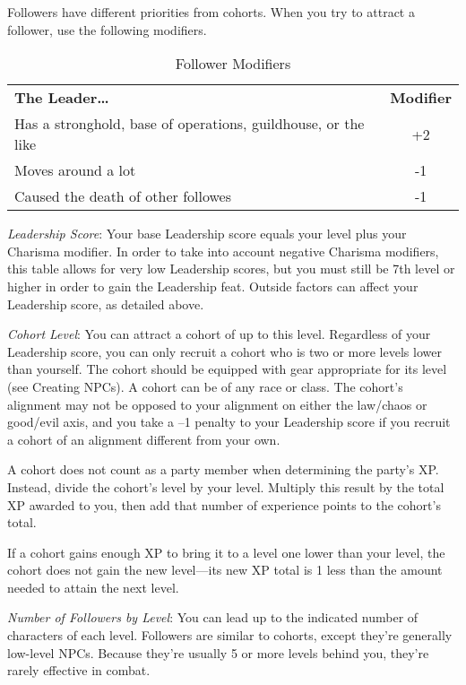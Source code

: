 				
Followers have different priorities from cohorts. When you try to attract a follower, use the following modifiers.\newline

\begin{table}[htb]
\sffamily
{}
\caption{Follower Modifiers}
\centering
\begin{tabularx}{\linewidth}{Xc}
\textbf{The Leader\ldots{}} & \textbf{Modifier}\\
Has a stronghold, base of operations, guildhouse, or the like & +2\\
Moves around a lot & -1\\
Caused the death of other followes & -1\\
\end{tabularx}
\end{table}
				
\textit{Leadership Score}: Your base Leadership score equals your level plus your Charisma modifier. In order to take into account negative Charisma modifiers, this table allows for very low Leadership scores, but you must still be 7th level or higher in order to gain the Leadership feat. Outside factors can affect your Leadership score, as detailed above.
				
\textit{Cohort Level}: You can attract a cohort of up to this level. Regardless of your Leadership score, you can only recruit a cohort who is two or more levels lower than yourself. The cohort should be equipped with gear appropriate for its level (see Creating NPCs). A cohort can be of any race or class. The cohort's alignment may not be opposed to your alignment on either the law/chaos or good/evil axis, and you take a --1 penalty to your Leadership score if you recruit a cohort of an alignment different from your own.\newline
				
A cohort does not count as a party member when determining the party's XP. Instead, divide the cohort's level by your level. Multiply this result by the total XP awarded to you, then add that number of experience points to the cohort's total.

If a cohort gains enough XP to bring it to a level one lower than your level, the cohort does not gain the new level---its new XP total is 1 less than the amount needed to attain the next level. 
				
\textit{Number of Followers by Level}: You can lead up to the indicated number of characters of each level. Followers are similar to cohorts, except they're generally low-level NPCs. Because they're usually 5 or more levels behind you, they're rarely effective in combat.
                
